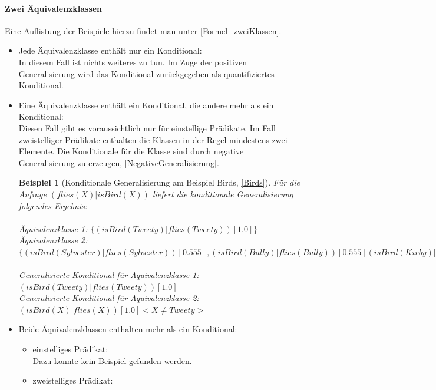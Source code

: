 \documentclass[a4paper, 11pt]{book}
\newtheorem{Bsp}{Beispiel}[section]
\begin{document}
\paragraph{Zwei Äquivalenzklassen}
Eine Auflistung der Beispiele hierzu findet man unter \ref{Formel_zweiKlassen}.
\begin{itemize}
	\item Jede Äquivalenzklasse enthält nur ein Konditional:\\
	In diesem Fall ist nichts weiteres zu tun. Im Zuge der positiven Generalisierung wird das Konditional zurückgegeben als quantifiziertes Konditional.
	\item Eine Äquivalenzklasse enthält ein Konditional, die andere mehr als ein Konditional:\\ %
	Diesen Fall gibt es voraussichtlich nur für einstellige Prädikate. Im Fall zweistelliger Prädikate enthalten die Klassen in der Regel mindestens zwei Elemente.  Die Konditionale für die Klasse sind durch negative Generalisierung zu erzeugen, \ref{NegativeGeneralisierung}. 
	\begin{Bsp}[Konditionale Generalisierung am Beispiel Birds, \ref{Birds}]
	Für die Anfrage $ (flies(X) | isBird(X)) $ liefert die konditionale Generalisierung folgendes Ergebnis:\\
	\\
	Äquivalenzklasse 1: $ \{(isBird(Tweety)|flies(Tweety))[1.0]\} $\\
	Äquivalenzklasse 2: $ \{(isBird(Sylvester)|flies(Sylvester))[0.555], (isBird(Bully)|flies(Bully))[0.555] (isBird(Kirby)|flies(Kirby))[0.555] \}  $\\
	\\
	Generalisierte Konditional für Äquivalenzklasse 1: $ (isBird(Tweety)|flies(Tweety))[1.0]$\\
	Generalisierte Konditional für Äquivalenzklasse 2: $ (isBird(X)|flies(X))[1.0] <X \neq Tweety>$\\
	\end{Bsp}
	\item Beide Äquivalenzklassen enthalten mehr als ein Konditional:\\
	\begin{itemize}
		\item einstelliges Prädikat:\\
		Dazu konnte kein Beispiel gefunden werden.
		\item zweistelliges Prädikat:\\

\end{itemize}
\end{itemize}
\end{document}
